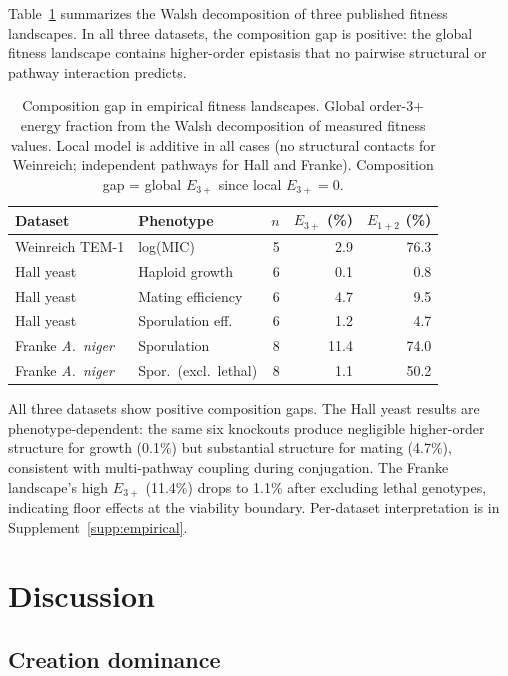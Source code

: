 \documentclass[10pt]{article}
\begin{document}
Table~\ref{tab:empirical} summarizes the Walsh decomposition of three
published fitness landscapes. In all three datasets, the composition
gap is positive: the global fitness landscape contains higher-order
epistasis that no pairwise structural or pathway interaction
predicts.

\begin{table}[t]
\centering
\caption{Composition gap in empirical fitness landscapes. Global
order-3+ energy fraction from the Walsh decomposition of measured
fitness values. Local model is additive in all cases (no structural
contacts for Weinreich; independent pathways for Hall and Franke).
Composition gap = global $E_{3+}$ since local $E_{3+} = 0$.}
\label{tab:empirical}
\begin{tabular}{llrrr}
\toprule
Dataset & Phenotype & $n$ & $E_{3+}$ (\%) & $E_{1+2}$ (\%) \\
\midrule
Weinreich TEM-1 & log(MIC) & 5 & 2.9 & 76.3 \\
Hall yeast & Haploid growth & 6 & 0.1 & 0.8 \\
Hall yeast & Mating efficiency & 6 & 4.7 & 9.5 \\
Hall yeast & Sporulation eff. & 6 & 1.2 & 4.7 \\
Franke \emph{A.~niger} & Sporulation & 8 & 11.4 & 74.0 \\
Franke \emph{A.~niger} & Spor.\ (excl.\ lethal) & 8 & 1.1 & 50.2 \\
\bottomrule
\end{tabular}
\end{table}

All three datasets show positive composition gaps. The Hall yeast
results are phenotype-dependent: the same six knockouts produce
negligible higher-order structure for growth (0.1\%) but substantial
structure for mating (4.7\%), consistent with multi-pathway coupling
during conjugation. The Franke landscape's high $E_{3+}$ (11.4\%)
drops to 1.1\% after excluding lethal genotypes, indicating floor
effects at the viability boundary. Per-dataset interpretation is in
Supplement~\ref{supp:empirical}.


\section{Discussion}
\label{sec:discussion}

\subsection{Creation dominance}
\end{document}
